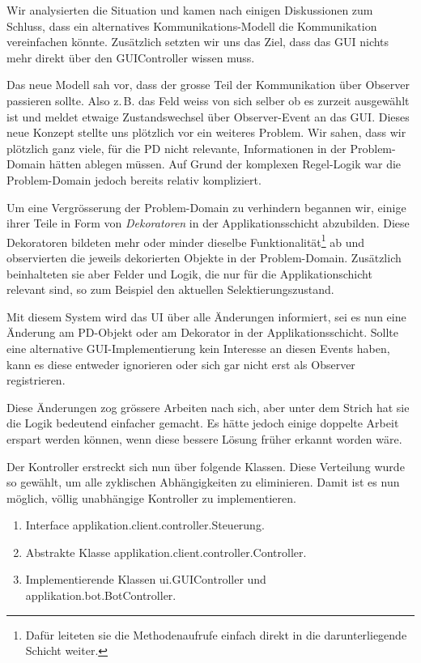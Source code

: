\documentclass[12pt,halfparskip]{scrartcl}
\begin{document}
Wir analysierten die Situation und kamen nach einigen Diskussionen zum Schluss, dass ein alternatives Kommunikations-Modell die Kommunikation vereinfachen könnte. Zusätzlich setzten wir uns das Ziel, dass das GUI nichts mehr direkt über den GUIController wissen muss. 

Das neue Modell sah vor, dass der grosse Teil der Kommunikation über Observer passieren sollte. Also z.\,B. das Feld weiss von sich selber ob es zurzeit ausgewählt ist und meldet etwaige Zustandswechsel über Observer-Event an das GUI. Dieses neue Konzept stellte uns plötzlich vor ein weiteres Problem. Wir sahen, dass wir plötzlich ganz viele, für die PD nicht relevante, Informationen in der Problem-Domain hätten ablegen müssen. Auf Grund der komplexen Regel-Logik war die Problem-Domain jedoch bereits relativ kompliziert. 

Um eine Vergrösserung der Problem-Domain zu verhindern begannen wir, einige ihrer Teile in Form von \emph{Dekoratoren} in der Applikationsschicht abzubilden. Diese Dekoratoren bildeten mehr oder minder dieselbe Funktionalität\footnote{Dafür leiteten sie die Methodenaufrufe einfach direkt in die darunterliegende Schicht weiter.} ab und observierten die jeweils dekorierten Objekte in der Problem-Domain. Zusätzlich beinhalteten sie aber Felder und Logik, die nur für die Applikationschicht relevant sind, so zum Beispiel den aktuellen Selektierungszustand.

Mit diesem System wird das UI über alle Änderungen informiert, sei es nun eine Änderung am PD-Objekt oder am Dekorator in der Applikationsschicht. Sollte eine alternative GUI-Implementierung kein Interesse an diesen Events haben, kann es diese entweder ignorieren oder sich gar nicht erst als Observer registrieren.

Diese Änderungen zog grössere Arbeiten nach sich, aber unter dem Strich hat sie die Logik bedeutend einfacher gemacht. Es hätte jedoch einige doppelte Arbeit erspart werden können, wenn diese bessere Lösung früher erkannt worden wäre.

Der Kontroller erstreckt sich nun über folgende Klassen. Diese Verteilung wurde so gewählt, um alle zyklischen Abhängigkeiten zu eliminieren. Damit ist es nun möglich, völlig unabhängige Kontroller zu implementieren.
\begin{enumerate}
	\item Interface applikation.client.controller.Steuerung.
	\item Abstrakte Klasse applikation.client.controller.Controller.
	\item Implementierende Klassen ui.GUIController und applikation.bot.BotController.
\end{enumerate}
\end{document}
